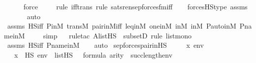 \begin{isabellebody}
\ \ \ \ \isamarkupfalse%
\ force\ \isanewline
\ \ \ \isamarkupfalse%
{\isacharparenleft}{\kern0pt}rule\ iff{\isacharunderscore}{\kern0pt}trans{\isacharcomma}{\kern0pt}\ rule\ sats{\isacharunderscore}{\kern0pt}ren{\isacharunderscore}{\kern0pt}sep{\isacharunderscore}{\kern0pt}forces{\isacharunderscore}{\kern0pt}fm{\isacharunderscore}{\kern0pt}iff{\isacharparenright}{\kern0pt}\isanewline
\ \ \isamarkupfalse%
\ forcesHS{\isacharunderscore}{\kern0pt}type\ assms\ \isanewline
\ \ \ \ \ \isamarkupfalse%
\ auto{\isacharbrackleft}{\kern0pt}{}{\isacharbrackright}{\kern0pt}\isanewline
\ \ \isamarkupfalse%
\ assms\ HS{\isacharunderscore}{\kern0pt}iff\ P{\isacharunderscore}{\kern0pt}in{\isacharunderscore}{\kern0pt}M\ transM\ pair{\isacharunderscore}{\kern0pt}in{\isacharunderscore}{\kern0pt}M{\isacharunderscore}{\kern0pt}iff\ leq{\isacharunderscore}{\kern0pt}in{\isacharunderscore}{\kern0pt}M\ one{\isacharunderscore}{\kern0pt}in{\isacharunderscore}{\kern0pt}M\ {\isasymF}{\isacharunderscore}{\kern0pt}in{\isacharunderscore}{\kern0pt}M\ {\isasymG}{\isacharunderscore}{\kern0pt}in{\isacharunderscore}{\kern0pt}M\ P{\isacharunderscore}{\kern0pt}auto{\isacharunderscore}{\kern0pt}in{\isacharunderscore}{\kern0pt}M\ P{\isacharunderscore}{\kern0pt}name{\isacharunderscore}{\kern0pt}in{\isacharunderscore}{\kern0pt}M\ \isanewline
\ \ \isamarkupfalse%
\ simp\isanewline
\ \ \isamarkupfalse%
{\isacharparenleft}{\kern0pt}rule{\isacharunderscore}{\kern0pt}tac\ A{\isacharequal}{\kern0pt}{\isachardoublequoteopen}list{\isacharparenleft}{\kern0pt}HS{\isacharparenright}{\kern0pt}{\isachardoublequoteclose}\ \ subsetD{\isacharcomma}{\kern0pt}\ rule\ list{\isacharunderscore}{\kern0pt}mono{\isacharparenright}{\kern0pt}\isanewline
\ \ \isamarkupfalse%
\ assms\ HS{\isacharunderscore}{\kern0pt}iff\ P{\isacharunderscore}{\kern0pt}name{\isacharunderscore}{\kern0pt}in{\isacharunderscore}{\kern0pt}M\isanewline
\ \ \isamarkupfalse%
\ auto%
\endisatagproof
{\isafoldproof}%
%
\isadelimproof
\isanewline
%
\endisadelimproof
\isanewline
{}\isamarkupfalse%
\ sep{\isacharunderscore}{\kern0pt}forces{\isacharunderscore}{\kern0pt}pair{\isacharunderscore}{\kern0pt}in{\isacharunderscore}{\kern0pt}HS\ {\isacharcolon}{\kern0pt}\ \isanewline
\ \ \ x\ env\ {\isasymphi}\isanewline
\ \ \ {\isachardoublequoteopen}x\ {\isasymin}\ HS{\isachardoublequoteclose}\ {\isachardoublequoteopen}env\ {\isasymin}\ list{\isacharparenleft}{\kern0pt}HS{\isacharparenright}{\kern0pt}{\isachardoublequoteclose}\ {\isachardoublequoteopen}{\isasymphi}\ {\isasymin}\ formula{\isachardoublequoteclose}\ {\isachardoublequoteopen}arity{\isacharparenleft}{\kern0pt}{\isasymphi}{\isacharparenright}{\kern0pt}\ {\isasymle}\ succ{\isacharparenleft}{\kern0pt}length{\isacharparenleft}{\kern0pt}env{\isacharparenright}{\kern0pt}{\isacharparenright}{\kern0pt}{\isachardoublequoteclose}\ \isanewline

\end{isabellebody}
